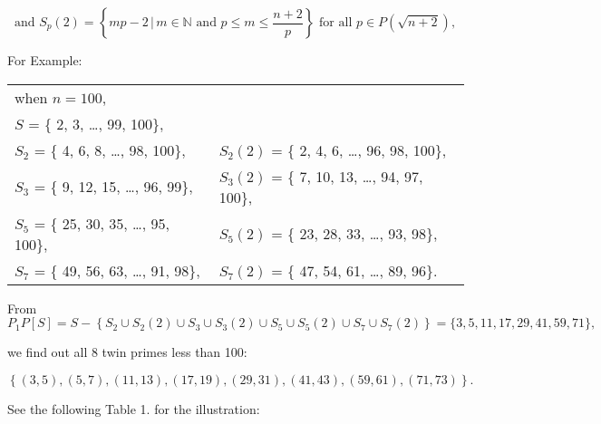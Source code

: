 \documentclass{article}
\begin{document}
\begin{equation}
\text{and } S_{p}(2) = \left\{ mp-2 \, | \, m \in \mathbb{N} \text{ and } p \leq m \leq \frac{n+2}{p} \right\} \text{ for all } p \in P(\sqrt{n+2}),
\end{equation}

\vspace{1\baselineskip}

For Example:
\begin{center}
\begin{tabular}{ll}
when \( n = 100\), & \\
\( S \)              = \{ 2, 3, \ldots , 99, 100\},                & \\
\( S_{2} \)          = \{ 4, 6, 8, \ldots , 98, 100\},            & \( S_{2}(2) \)       = \{ 2, 4, 6, \ldots , 96, 98, 100\}, \\
\( S_{3} \)          = \{ 9, 12, 15, \ldots , 96, 99\},           & \( S_{3}(2) \)       = \{ 7, 10, 13, \ldots , 94, 97, 100\}, \\
\( S_{5} \)          = \{ 25, 30, 35, \ldots , 95, 100\},         & \( S_{5}(2) \)       = \{ 23, 28, 33, \ldots , 93, 98\}, \\
\( S_{7} \)          = \{ 49, 56, 63, \ldots , 91, 98\},          & \( S_{7}(2) \)       = \{ 47, 54, 61, \ldots , 89, 96\}. \\
\end{tabular}
\end{center}
\vspace{1\baselineskip}
From
\begin{equation}
  P_{1}P\left[S\right] = S-\left\{ S_{2}\cup  S_{2}\left(2\right)\cup  S_{3}\cup  S_{3}\left(2\right)\cup  S_{5}\cup  S_{5}\left(2\right)\cup  S_{7}\cup  S_{7}\left(2\right)\right\}  = \{ 3, 5, 11, 17, 29, 41, 59, 71\} ,
\end{equation}


we find out all 8 twin primes less than 100:

\begin{equation}
\left\{\left(3, 5\right),\left(5, 7\right),\left(11, 13\right),\left(17, 19\right),\left(29, 31\right),\left(41, 43\right),\left(59, 61\right),\left(71, 73\right)\right\} .
\end{equation}

\vspace{1\baselineskip}

See the following Table 1. for the illustration:
\end{document}
